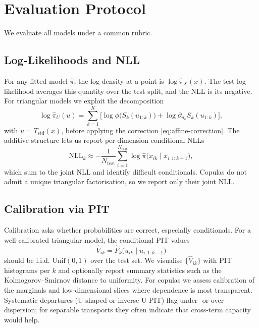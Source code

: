 \documentclass[11pt,a4paper,twoside]{book}\usepackage[]{graphicx}\usepackage[]{xcolor}
\begin{document}
\section{Evaluation Protocol}

We evaluate all models under a common rubric.

\subsection{Log-Likelihoods and NLL}

For any fitted model $\hat{\pi}$, the log-density at a point is $\log \hat{\pi}_X(x)$. The test log-likelihood averages this quantity over the test split, and the NLL is its negative. For triangular models we exploit the decomposition
\begin{equation}
  \log \hat{\pi}_U(u) = \sum_{k=1}^K \Big[ \log \phi\big(S_k(u_{1:k})\big) + \log \partial_{u_k} S_k(u_{1:k}) \Big],
  \label{eq:nll-decomposition}
\end{equation}
with $u=T_{\mathrm{std}}(x)$, before applying the correction \eqref{eq:affine-correction}. The additive structure lets us report per-dimension conditional NLLs
\begin{equation}
  \mathrm{NLL}_k \approx -\frac{1}{N_{\mathrm{test}}} \sum_{i=1}^{N_{\mathrm{test}}} \log \hat{\pi}\big(x_{ik} \mid x_{i,1:k-1}\big),
  \label{eq:conditional-nll}
\end{equation}
which sum to the joint NLL and identify difficult conditionals. Copulas do not admit a unique triangular factorisation, so we report only their joint NLL.

\subsection{Calibration via PIT}

Calibration asks whether probabilities are correct, especially conditionals. For a well-calibrated triangular model, the conditional PIT values
\begin{equation}
  \widehat{V}_{ik} = \widehat{F}_k\big(u_{ik} \mid u_{i,1:k-1}\big)
  \label{eq:pit}
\end{equation}
should be i.i.d. $\mathrm{Unif}(0,1)$ over the test set. We visualise $\{\widehat{V}_{ik}\}$ with PIT histograms per $k$ and optionally report summary statistics such as the Kolmogorov--Smirnov distance to uniformity. For copulas we assess calibration of the marginals and low-dimensional slices where dependence is most transparent. Systematic departures (U-shaped or inverse-U PIT) flag under- or over-dispersion; for separable transports they often indicate that cross-term capacity would help.
\end{document}
